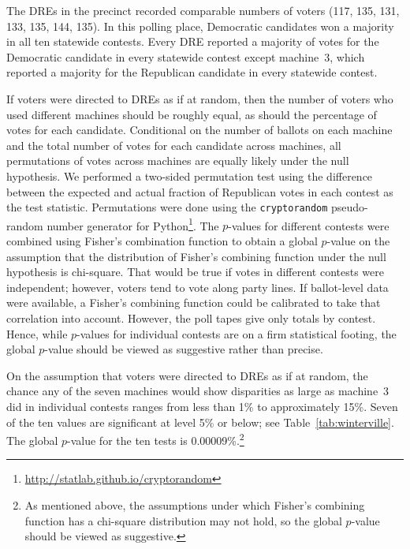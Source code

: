\documentclass[runningheads]{llncs}
\begin{document}
The DREs in the precinct recorded comparable numbers of voters (117, 135, 131, 133, 135, 144, 135).
In this polling place, Democratic candidates won a majority in all ten statewide contests.
Every DRE reported a majority of votes for the Democratic candidate in every statewide contest 
except machine~3, which reported a majority for the Republican candidate in every statewide contest.


If voters were directed to DREs as if at random, then the number of voters who used different machines should be roughly equal, as should the percentage of votes for each candidate.
Conditional on the number of ballots on each machine and the total number of votes for each candidate across machines,
all permutations of votes across machines are equally likely under the null hypothesis.
We performed a two-sided permutation test using the difference between the expected and actual fraction of Republican votes in each contest as the test statistic.
Permutations were done using the \texttt{cryptorandom} pseudo-random number generator for Python\footnote{%
\url{http://statlab.github.io/cryptorandom}
}. %
The $p$-values for different contests were combined using Fisher's combination function to obtain a global $p$-value on the assumption that the distribution of Fisher's combining function under the null hypothesis is chi-square.
That would be true if votes in different contests were independent; however, voters tend to vote along party lines.
If ballot-level data were available, a Fisher's combining function could be calibrated to take that correlation into account.
However, the poll tapes give only totals by contest.
Hence, while $p$-values for individual contests are on a firm statistical footing, the global $p$-value should be viewed as suggestive rather than precise.

On the assumption that voters were directed to DREs as if at random, 
the chance any of the seven machines would show disparities as large as machine~3 did in individual contests ranges 
from less than 1\% to approximately 15\%.  
Seven of the ten values are significant at level 5\% or below; see Table~\ref{tab:winterville}.
The global $p$-value for the ten tests is 0.00009\%.\footnote{%
As mentioned above, the assumptions under which Fisher's combining function has a chi-square distribution may not hold, so the global $p$-value should be viewed as suggestive.}
\end{document}
